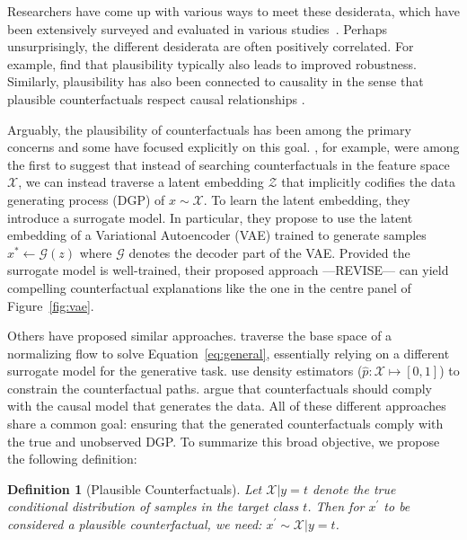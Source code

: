 \documentclass{article}
\newtheorem{definition}{Definition}[section]
\begin{document}
Researchers have come up with various ways to meet these desiderata, which have been extensively surveyed and evaluated in various studies~\citep{verma2020counterfactual,karimi2020survey,pawelczyk2021carla,artelt2021evaluating,guidotti2022counterfactual}. Perhaps unsurprisingly, the different desiderata are often positively correlated. For example, \citet{artelt2021evaluating} find that plausibility typically also leads to improved robustness. Similarly, plausibility has also been connected to causality in the sense that plausible counterfactuals respect causal relationships \citep{mahajan2020preserving}. 

Arguably, the plausibility of counterfactuals has been among the primary concerns and some have focused explicitly on this goal. \citet{joshi2019realistic}, for example, were among the first to suggest that instead of searching counterfactuals in the feature space $\mathcal{X}$, we can instead traverse a latent embedding $\mathcal{Z}$ that implicitly codifies the data generating process (DGP) of $x\sim\mathcal{X}$. To learn the latent embedding, they introduce a surrogate model. In particular, they propose to use the latent embedding of a Variational Autoencoder (VAE) trained to generate samples $x^* \leftarrow \mathcal{G}(z)$ where $\mathcal{G}$ denotes the decoder part of the VAE. Provided the surrogate model is well-trained, their proposed approach ---REVISE--- can yield compelling counterfactual explanations like the one in the centre panel of Figure~\ref{fig:vae}. 

Others have proposed similar approaches. \citet{dombrowski2021diffeomorphic} traverse the base space of a normalizing flow to solve Equation~\ref{eq:general}, essentially relying on a different surrogate model for the generative task. \citet{poyiadzi2020face} use density estimators ($\hat{p}: \mathcal{X} \mapsto [0,1]$) to constrain the counterfactual paths. \citet{karimi2021algorithmic} argue that counterfactuals should comply with the causal model that generates the data. All of these different approaches share a common goal: ensuring that the generated counterfactuals comply with the true and unobserved DGP. To summarize this broad objective, we propose the following definition:

\begin{definition}[Plausible Counterfactuals]
  \label{def:plausible}
  Let $\mathcal{X}|y=t$ denote the true conditional distribution of samples in the target class $t$. Then for $x^{\prime}$ to be considered a plausible counterfactual, we need: $x^{\prime} \sim \mathcal{X}|y=t$.
\end{definition}
\end{document}
